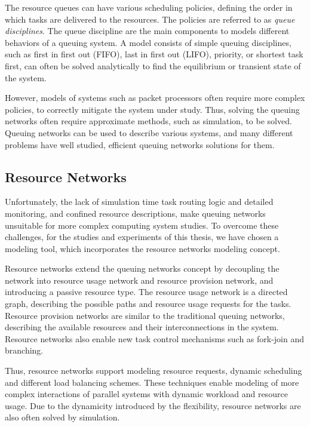 The resource queues can have various scheduling policies, defining the order in which tasks are delivered to the resources. The policies are referred to as \emph{queue disciplines}. The queue discipline are the main components to models different behaviors of a queuing system. A model consists of simple queuing disciplines, such as first in first out (FIFO), last in first out (LIFO), priority, or shortest task first, can often be solved analytically to find the equilibrium or transient state of the system.~\cite{Bolch:2006:Queuing}

However, models of systems such as packet processors often require more complex policies, to correctly mitigate the system under study. Thus, solving the queuing networks often require approximate methods, such as simulation, to be solved. Queuing networks can be used to describe various systems, and many different problems have well studied, efficient queuing networks solutions for them.~\cite{Bolch:2006:Queuing}

\subsection{Resource Networks}

Unfortunately, the lack of simulation time task routing logic and detailed monitoring, and confined resource descriptions, make queuing networks unsuitable for more complex computing system studies. To overcome these challenges, for the studies and experiments of this thesis, we have chosen a modeling tool, which incorporates the resource networks modeling concept.~\cite{Bolch:2006:Queuing}

Resource networks extend the queuing networks concept by decoupling the network into resource usage network and resource provision network, and introducing a passive resource type. The resource usage network is a directed graph, describing the possible paths and resource usage requests for the tasks. Resource provision networks are similar to the traditional queuing networks, describing the available resources and their interconnections in the system. Resource networks also enable new task control mechanisms such as fork-join and branching. ~\cite{Menasce:1994:CPP}

Thus, resource networks support modeling resource requests, dynamic scheduling and different load balancing schemes. These techniques enable modeling of more complex interactions of parallel systems with dynamic workload and resource usage. Due to the dynamicity introduced by the flexibility, resource networks are also often solved by simulation.~\cite{Menasce:1994:CPP}

